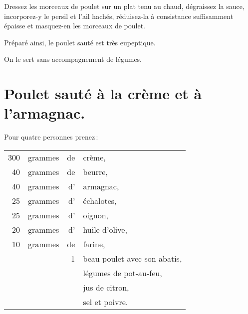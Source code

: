 Dressez les morceaux de poulet sur un plat tenu au chaud, dégraissez la sauce,
incorporez-y le persil et l'ail hachés, réduisez-la à consistance suffisamment
épaisse et masquez-en les morceaux de poulet.

Préparé ainsi, le poulet sauté est très eupeptique.

On le sert sans accompagnement de légumes.

\section*{\centering Poulet sauté à la crème et à l’armagnac.}
{}

Pour quatre personnes prenez :

\medskip

\footnotesize
\begin{longtable}{rrrp{16em}}
    300 & grammes & de & crème,                                                                           \\
     40 & grammes & de & beurre,                                                                          \\
     40 & grammes & d' & armagnac,                                                                        \\
     25 & grammes & d' & échalotes,                                                                       \\
     25 & grammes & d' & oignon,                                                                          \\
     20 & grammes & d' & huile d'olive,                                                                   \\
     10 & grammes & de & farine,                                                                          \\
        &         &  1 & beau poulet avec son abatis,                                                     \\
        &         &    & légumes de pot-au-feu,                                                           \\
        &         &    & jus de citron,                                                                   \\
        &         &    & sel et poivre.                                                                   \\
\end{longtable}
\normalsize


